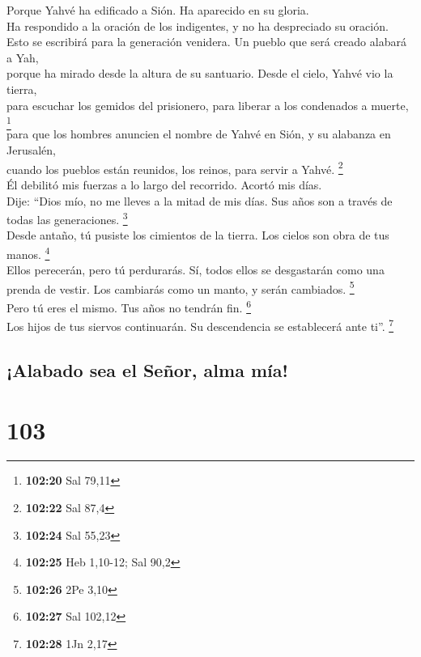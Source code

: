  Porque Yahvé ha edificado a Sión. Ha aparecido en su
gloria.\\
 Ha respondido a la oración de los indigentes, y no ha
despreciado su oración.\\
 Esto se escribirá para la generación venidera. Un pueblo
que será creado alabará a Yah,\\
 porque ha mirado desde la altura de su santuario. Desde
el cielo, Yahvé vio la tierra,\\
 para escuchar los gemidos del prisionero, para liberar a
los condenados a muerte, \footnote{\textbf{102:20} Sal 79,11}\\
 para que los hombres anuncien el nombre de Yahvé en
Sión, y su alabanza en Jerusalén,\\
 cuando los pueblos están reunidos, los reinos, para
servir a Yahvé. \footnote{\textbf{102:22} Sal 87,4}\\
 Él debilitó mis fuerzas a lo largo del recorrido. Acortó
mis días.\\
 Dije: ``Dios mío, no me lleves a la mitad de mis días.
Sus años son a través de todas las generaciones. \footnote{\textbf{102:24}
  Sal 55,23}\\
 Desde antaño, tú pusiste los cimientos de la tierra. Los
cielos son obra de tus manos. \footnote{\textbf{102:25} Heb 1,10-12; Sal
  90,2}\\
 Ellos perecerán, pero tú perdurarás. Sí, todos ellos se
desgastarán como una prenda de vestir. Los cambiarás como un manto, y
serán cambiados. \footnote{\textbf{102:26} 2Pe 3,10}\\
 Pero tú eres el mismo. Tus años no tendrán fin.
\footnote{\textbf{102:27} Sal 102,12}\\
 Los hijos de tus siervos continuarán. Su descendencia se
establecerá ante ti''. \footnote{\textbf{102:28} 1Jn 2,17}

\hypertarget{alabado-sea-el-seuxf1or-alma-muxeda}{%
\subsection{¡Alabado sea el Señor, alma
mía!}\label{alabado-sea-el-seuxf1or-alma-muxeda}}

\hypertarget{section-100}{%
\section{103}\label{section-100}}

